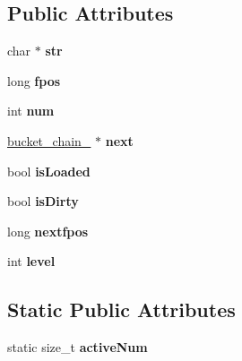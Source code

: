 \subsection*{Public Attributes}
\begin{CompactItemize}
\item 
\hypertarget{classbucket__chain___0be070399879e29dfd34317371c44985}{
char $\ast$ \textbf{str}}
\label{classbucket__chain___0be070399879e29dfd34317371c44985}

\item 
\hypertarget{classbucket__chain___8c1b8c3baf448d522a70e9b27ca3fba3}{
long \textbf{fpos}}
\label{classbucket__chain___8c1b8c3baf448d522a70e9b27ca3fba3}

\item 
\hypertarget{classbucket__chain___9193232fe8aa719059a6a080cebd4c63}{
int \textbf{num}}
\label{classbucket__chain___9193232fe8aa719059a6a080cebd4c63}

\item 
\hypertarget{classbucket__chain___43e53c34c1f87561b69cb0cb818f48f1}{
\hyperlink{classbucket__chain__}{bucket\_\-chain\_\-} $\ast$ \textbf{next}}
\label{classbucket__chain___43e53c34c1f87561b69cb0cb818f48f1}

\item 
\hypertarget{classbucket__chain___16a812fdc6108a3017984823a81812e2}{
bool \textbf{isLoaded}}
\label{classbucket__chain___16a812fdc6108a3017984823a81812e2}

\item 
\hypertarget{classbucket__chain___0b2de2bb5fe9a19f865b3c7fa262b74e}{
bool \textbf{isDirty}}
\label{classbucket__chain___0b2de2bb5fe9a19f865b3c7fa262b74e}

\item 
\hypertarget{classbucket__chain___747b1d2f7f76867541769ff602f237c7}{
long \textbf{nextfpos}}
\label{classbucket__chain___747b1d2f7f76867541769ff602f237c7}

\item 
\hypertarget{classbucket__chain___ff131903eb6f2783a9ddb235051cd146}{
int \textbf{level}}
\label{classbucket__chain___ff131903eb6f2783a9ddb235051cd146}

\end{CompactItemize}
\subsection*{Static Public Attributes}
\begin{CompactItemize}
\item 
\hypertarget{classbucket__chain___3377e4155e3ae57148b0a861949fa1d3}{
static size\_\-t \textbf{activeNum}}
\label{classbucket__chain___3377e4155e3ae57148b0a861949fa1d3}

\end{CompactItemize}


